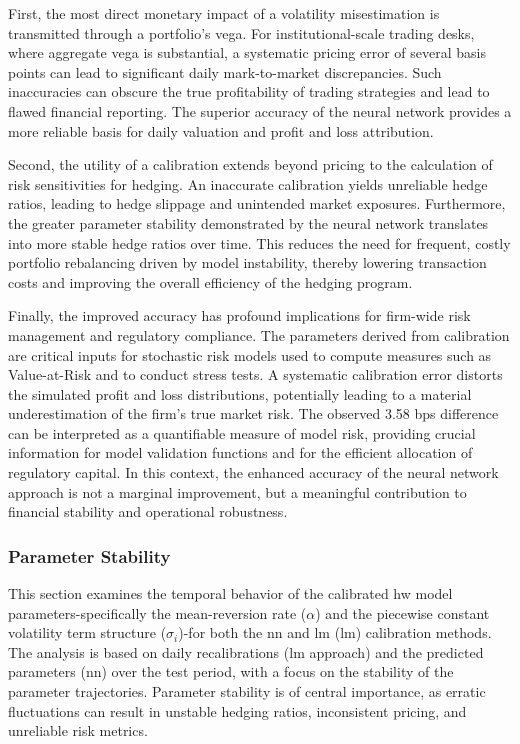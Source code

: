 First, the most direct monetary impact of a volatility misestimation is transmitted through a portfolio's vega. For institutional-scale trading desks, where aggregate vega is substantial, a systematic pricing error of several basis points can lead to significant daily mark-to-market discrepancies. Such inaccuracies can obscure the true profitability of trading strategies and lead to flawed financial reporting. The superior accuracy of the neural network provides a more reliable basis for daily valuation and profit and loss attribution.

Second, the utility of a calibration extends beyond pricing to the calculation of risk sensitivities for hedging. An inaccurate calibration yields unreliable hedge ratios, leading to hedge slippage and unintended market exposures. Furthermore, the greater parameter stability demonstrated by the neural network translates into more stable hedge ratios over time. This reduces the need for frequent, costly portfolio rebalancing driven by model instability, thereby lowering transaction costs and improving the overall efficiency of the hedging program.

Finally, the improved accuracy has profound implications for firm-wide risk management and regulatory compliance. The parameters derived from calibration are critical inputs for stochastic risk models used to compute measures such as Value-at-Risk and to conduct stress tests. A systematic calibration error distorts the simulated profit and loss distributions, potentially leading to a material underestimation of the firm's true market risk. The observed 3.58 bps difference can be interpreted as a quantifiable measure of model risk, providing crucial information for model validation functions and for the efficient allocation of regulatory capital. In this context, the enhanced accuracy of the neural network approach is not a marginal improvement, but a meaningful contribution to financial stability and operational robustness.

\subsubsection{Parameter Stability}
This section examines the temporal behavior of the calibrated \ac{hw} model parameters-specifically the mean-reversion rate (\(\alpha\)) and the piecewise constant volatility term structure (\(\sigma_i\))-for both the \ac{nn} and \ac{lm} (\ac{lm}) calibration methods. The analysis is based on daily recalibrations (\ac{lm} approach) and the predicted parameters (\ac{nn}) over the test period, with a focus on the stability  of the parameter trajectories. Parameter stability is of central importance, as erratic fluctuations can result in unstable hedging ratios, inconsistent pricing, and unreliable risk metrics.

